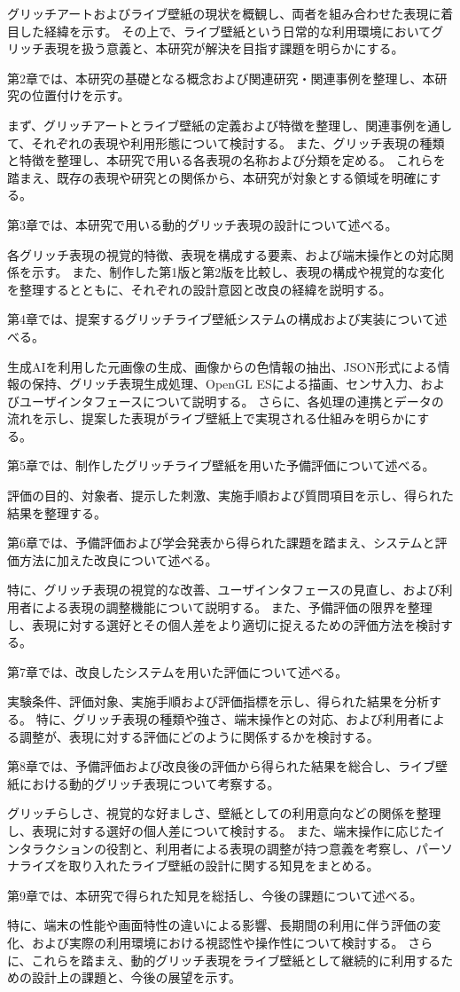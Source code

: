 グリッチアートおよびライブ壁紙の現状を概観し、両者を組み合わせた表現に着目した経緯を示す。
その上で、ライブ壁紙という日常的な利用環境においてグリッチ表現を扱う意義と、本研究が解決を目指す課題を明らかにする。


第2章では、本研究の基礎となる概念および関連研究・関連事例を整理し、本研究の位置付けを示す。

まず、グリッチアートとライブ壁紙の定義および特徴を整理し、関連事例を通して、それぞれの表現や利用形態について検討する。
また、グリッチ表現の種類と特徴を整理し、本研究で用いる各表現の名称および分類を定める。
これらを踏まえ、既存の表現や研究との関係から、本研究が対象とする領域を明確にする。


第3章では、本研究で用いる動的グリッチ表現の設計について述べる。

各グリッチ表現の視覚的特徴、表現を構成する要素、および端末操作との対応関係を示す。
また、制作した第1版と第2版を比較し、表現の構成や視覚的な変化を整理するとともに、それぞれの設計意図と改良の経緯を説明する。


第4章では、提案するグリッチライブ壁紙システムの構成および実装について述べる。

生成AIを利用した元画像の生成、画像からの色情報の抽出、JSON形式による情報の保持、グリッチ表現生成処理、OpenGL ESによる描画、センサ入力、およびユーザインタフェースについて説明する。
さらに、各処理の連携とデータの流れを示し、提案した表現がライブ壁紙上で実現される仕組みを明らかにする。


第5章では、制作したグリッチライブ壁紙を用いた予備評価について述べる。

評価の目的、対象者、提示した刺激、実施手順および質問項目を示し、得られた結果を整理する。


第6章では、予備評価および学会発表から得られた課題を踏まえ、システムと評価方法に加えた改良について述べる。

特に、グリッチ表現の視覚的な改善、ユーザインタフェースの見直し、および利用者による表現の調整機能について説明する。
また、予備評価の限界を整理し、表現に対する選好とその個人差をより適切に捉えるための評価方法を検討する。


第7章では、改良したシステムを用いた評価について述べる。

実験条件、評価対象、実施手順および評価指標を示し、得られた結果を分析する。
特に、グリッチ表現の種類や強さ、端末操作との対応、および利用者による調整が、表現に対する評価にどのように関係するかを検討する。


第8章では、予備評価および改良後の評価から得られた結果を総合し、ライブ壁紙における動的グリッチ表現について考察する。

グリッチらしさ、視覚的な好ましさ、壁紙としての利用意向などの関係を整理し、表現に対する選好の個人差について検討する。
また、端末操作に応じたインタラクションの役割と、利用者による表現の調整が持つ意義を考察し、パーソナライズを取り入れたライブ壁紙の設計に関する知見をまとめる。


第9章では、本研究で得られた知見を総括し、今後の課題について述べる。

特に、端末の性能や画面特性の違いによる影響、長期間の利用に伴う評価の変化、および実際の利用環境における視認性や操作性について検討する。
さらに、これらを踏まえ、動的グリッチ表現をライブ壁紙として継続的に利用するための設計上の課題と、今後の展望を示す。

